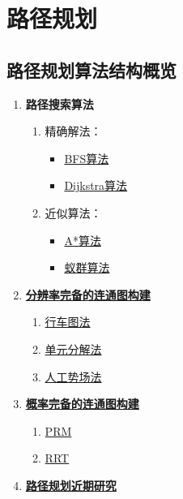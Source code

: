 \documentclass[../main.tex]{subfiles}
\begin{document}
\section{路径规划}

\subsection*{路径规划算法结构概览}
\begin{enumerate}
    \item \textbf{路径搜索算法}
    \begin{enumerate}
        \item 精确解法：
        \begin{itemize}
            \item \hyperref[subsubsec:BFS]{BFS算法}
            \item \hyperref[subsubsec:Dijkstra]{Dijkstra算法}
        \end{itemize}
        \item 近似算法：
        \begin{itemize}
            \item \hyperref[subsubsec:Astar]{A*算法}
            \item \hyperref[subsubsec:Ant]{蚁群算法}
        \end{itemize}
    \end{enumerate}

    \item \textbf{\hyperref[subsec:resolution_complete]{分辨率完备的连通图构建}}
    \begin{enumerate}
        \item \hyperref[item:res:roadmap]{行车图法}
        \item \hyperref[item:res:cell]{单元分解法}
        \item \hyperref[item:res:apf]{人工势场法}
    \end{enumerate}

    \item \textbf{\hyperref[subsec:probabilistic_complete]{概率完备的连通图构建}}
    \begin{enumerate}
        \item \hyperref[item:prob:prm]{PRM}
        \item \hyperref[item:prob:rrt]{RRT}
    \end{enumerate}

    \item \textbf{\hyperref[subsec:recent_research]{路径规划近期研究}}
\end{enumerate}
\end{document}
